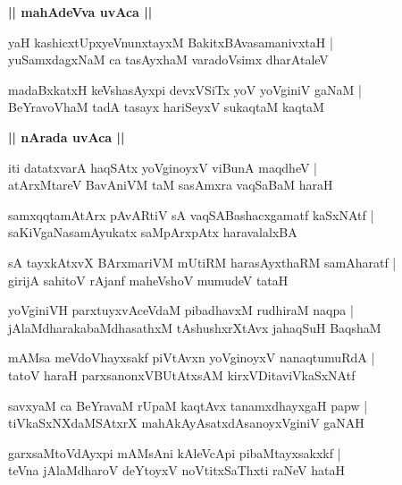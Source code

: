 \documentclass[twoside,12pt,openright]{book}
\newcounter{shloka}[chapter]
\def\uvaca#1{\centerline{{\large\textbf{#1}}}}
\begin{document}
\uvaca{|| mahAdeVva uvAca ||}

\begin{shloka}%
yaH kashicxtUpxyeVnunxtayxM BakitxBAvasamanivxtaH |\\
yuSamxdagxNaM ca tasAyxhaM varadoVsimx dharAtaleV 
\end{shloka}

\begin{shloka}%
madaBxkatxH keVshasAyxpi devxVSiTx yoV yoVginiV gaNaM |\\
BeYravoVhaM tadA tasayx hariSeyxV sukaqtaM kaqtaM 
\end{shloka}

\uvaca{|| nArada uvAca ||}

\begin{shloka}%
iti datatxvarA haqSAtx yoVginoyxV viBunA maqdheV |\\
atArxMtareV BavAniVM taM sasAmxra vaqSaBaM haraH 
\end{shloka}

\begin{shloka}%
samxqqtamAtArx pAvARtiV sA vaqSABashacxgamatf kaSxNAtf |\\
saKiVgaNasamAyukatx saMpArxpAtx haravalalxBA
\end{shloka}

\begin{shloka}%
sA tayxkAtxvX BArxmariVM mUtiRM harasAyxthaRM samAharatf |\\
girijA sahitoV rAjanf maheVshoV mumudeV tataH 
\end{shloka}

\begin{shloka}%
yoVginiVH parxtuyxvAceVdaM pibadhavxM rudhiraM naqpa |\\
jAlaMdharakabaMdhasathxM tAshushxrXtAvx ja{ha}qSuH BaqshaM 
\end{shloka}

\begin{shloka}%
mAMsa meVdoVhayxsakf piVtAvxn yoVginoyxV nanaqtumuRdA |\\
tatoV haraH parxsanonxVBUtAtxsAM kirxVDitaviVkaSxNAtf
\end{shloka}

\begin{shloka}%
savxyaM ca BeYravaM rUpaM kaqtAvx tanamxdhayxgaH papw |\\
tiVkaSxNXdaMSAtxrX mahAkAyAsatxdAsanoyxVginiV gaNAH 
\end{shloka}

\begin{shloka}%
garxsaMtoVdAyxpi mAMsAni kAleVcApi pibaMtayxsakxkf |\\
teVna jAlaMdharoV deYtoyxV noVtitxSaThxti raNeV hataH 
\end{shloka}
\end{document}
